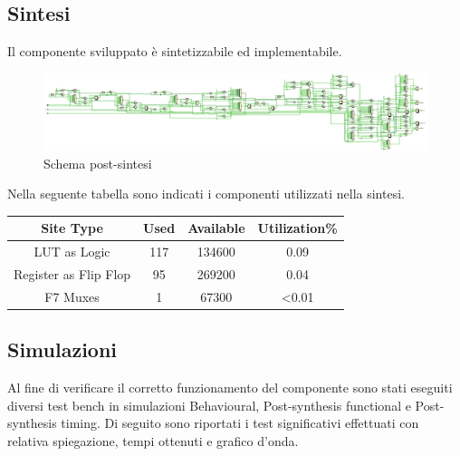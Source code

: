 \documentclass{article}
\begin{document}
\subsection{Sintesi}
Il componente sviluppato è sintetizzabile ed implementabile. 
\begin{figure}[H]
	\centering
	\includegraphics[width=1\textwidth]{assets/schematic.eps}
	\caption{Schema post-sintesi}
\end{figure}
Nella seguente tabella sono indicati i componenti utilizzati nella sintesi.
\begin{center}
	\begin{tabular}{c|c|c|c}
		
		Site Type   & Used & Available & Utilization\% \\
		\hline
		LUT as Logic & 117 & 134600 & 0.09 \\
		
		Register as Flip Flop & 95 & 269200  & 0.04\\
		
		F7 Muxes & 1 & 67300 & <0.01\\
		
	\end{tabular}
\end{center}



\subsection{Simulazioni}
Al fine di verificare il corretto funzionamento del componente sono stati eseguiti diversi test bench in simulazioni Behavioural, Post-synthesis functional e Post-synthesis timing. 
Di seguito sono riportati i test significativi effettuati con relativa spiegazione, tempi ottenuti e grafico d'onda.
\end{document}
